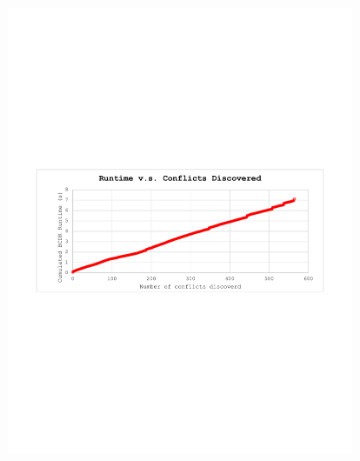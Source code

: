\documentclass[jair,twoside,11pt,theapa]{article}
\begin{document}
\begin{figure}[!ht]
	\centering
	\begin{subfigure}[b]{0.8\textwidth}
		\includegraphics[width=\textwidth,trim={2.5cm 10.2cm 2.4cm 10.3cm},clip]{figures/BunchConflict/runtime_conflict_discovered_400bunch.pdf}
		\caption{}
		\label{fig:cumulatied_conflict_discovery_improved}
	\end{subfigure}
	\begin{subfigure}[b]{0.8\textwidth}

\end{subfigure}
\end{figure}
\end{document}
